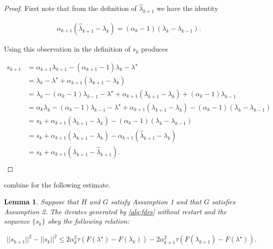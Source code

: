 \documentclass[11pt]{article}
\newtheorem{lemma}{Lemma}
\begin{document}
\begin{proof}
First note that from the definition of $\hat\lambda_{k+1}$ we have the identity

\begin{align}
\alpha_{k+1} (\hat\lambda_{k+1} - \lambda_k) = (\alpha_k - 1)(\lambda_k - \lambda_{k-1}). \label{eq:lem:2:1}
\end{align}

Using this observation in the definition of $s_k$ produces

\begin{align*}
s_{k+1} &= \alpha_{k+1}\lambda_{k+1} - (\alpha_{k+1} - 1)\lambda_k - \lambda^\star \\
&= \lambda_k - \lambda^\star + \alpha_{k+1}(\lambda_{k+1} - \lambda_k) \\
&= \lambda_k - (\alpha_k - 1)\lambda_{k-1} - \lambda^\star + \alpha_{k+1}(\lambda_{k+1} - \lambda_k) + (\alpha_k - 1)\lambda_{k-1}\\
&= \alpha_k\lambda_k - (\alpha_k - 1)\lambda_{k-1} - \lambda^\star + \alpha_{k+1}(\lambda_{k+1} - \lambda_k) - (\alpha_k - 1)(\lambda_k - \lambda_{k-1})\\
&= s_k + \alpha_{k+1}(\lambda_{k+1} - \lambda_k) - (\alpha_k - 1)(\lambda_k - \lambda_{k-1})\\
&= s_k + \alpha_{k+1}(\lambda_{k+1} - \lambda_k) - \alpha_{k+1}(\hat\lambda_{k+1} - \lambda_k)\\
&= s_k + \alpha_{k+1}(\lambda_{k+1} - \hat\lambda_{k+1}).\\
\end{align*}
\end{proof}

\noindent {} combine for the following estimate.

\begin{lemma}
\label{lem:3}
Suppose that $H$ and $G$ satisfy Assumption 1 and that $G$ satisfies Assumption 2.  The iterates generated by \cref{alg:fdrs} without restart and the sequence $\{s_k\}$ obey the following relation:

\begin{align*}
||s_{k+1}||^2 - ||s_k||^2 \le 2\alpha_k^2\tau \left(F(\lambda^\star) - F(\lambda_k)\right) - 2\alpha_{k+1}^2 \tau\left(F(\lambda_{k+1}) - F(\lambda^\star)\right).
\end{align*}
\end{lemma}
\end{document}
